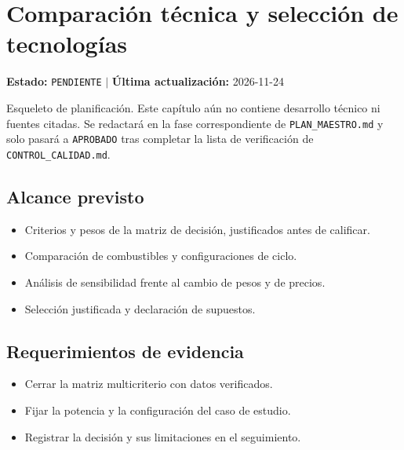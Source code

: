 \chapter{Comparación técnica y selección de tecnologías}
\label{cap:11}

\begin{cajaestado}
\textbf{Estado:} \texttt{PENDIENTE} \quad$|$\quad
\textbf{Última actualización:} 2026-11-24

Esqueleto de planificación. Este capítulo aún no contiene desarrollo técnico ni
fuentes citadas. Se redactará en la fase correspondiente de
\texttt{PLAN\_MAESTRO.md} y solo pasará a \texttt{APROBADO} tras completar
la lista de verificación de \texttt{CONTROL\_CALIDAD.md}.
\end{cajaestado}

\section{Alcance previsto}
\begin{itemize}
  \item Criterios y pesos de la matriz de decisión, justificados antes de calificar.
  \item Comparación de combustibles y configuraciones de ciclo.
  \item Análisis de sensibilidad frente al cambio de pesos y de precios.
  \item Selección justificada y declaración de supuestos.
\end{itemize}

\section{Requerimientos de evidencia}
\begin{itemize}
  \item Cerrar la matriz multicriterio con datos verificados.
  \item Fijar la potencia y la configuración del caso de estudio.
  \item Registrar la decisión y sus limitaciones en el seguimiento.
\end{itemize}
